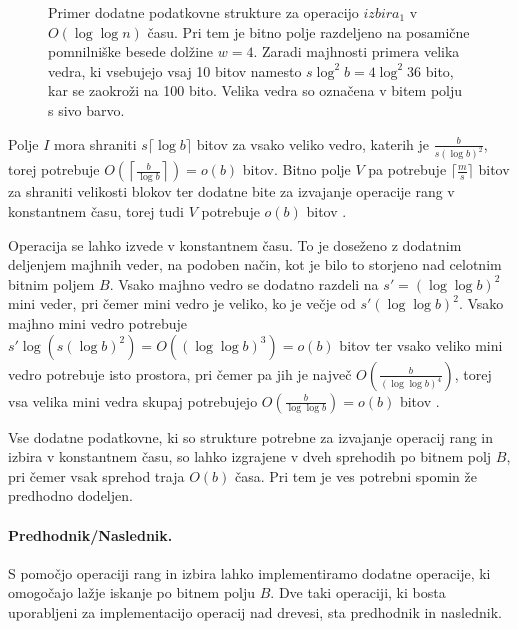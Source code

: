 \begin{figure}[htb]
    \begin{center}
        
        \caption{Primer dodatne podatkovne strukture za operacijo $izbira_1$ v $O(\log\log{n})$ času. Pri tem je bitno polje razdeljeno na posamične pomnilniške besede dolžine $w=4$. Zaradi majhnosti primera velika vedra, ki vsebujejo vsaj 10 bitov namesto $s\log^2b= 4\log^2{36}$ bito, kar se zaokroži na 100 bito. Velika vedra so označena v bitem polju s sivo barvo.} 
        \label{fig:select}
    \end{center}
\end{figure}

Polje $I$ mora shraniti $s\lceil\log b\rceil$ bitov za vsako veliko vedro, katerih je $\frac{b}{s(\log b)^2}$, torej potrebuje $O\left(\left\lceil\frac{b}{\log b}\right\rceil\right)=o(b)$ bitov. Bitno polje $V$ pa potrebuje $\lceil \frac{m}{s} \rceil$ bitov za shraniti velikosti blokov ter dodatne bite za izvajanje operacije rang v konstantnem času, torej tudi $V$ potrebuje $o(b)$ bitov \cite{Navarro2016}.

Operacija se lahko izvede v konstantnem času. To je doseženo z dodatnim deljenjem majhnih veder, na podoben način, kot je bilo to storjeno nad celotnim bitnim poljem $B$. Vsako majhno vedro se dodatno razdeli na $s'=(\log\log b)^2$ mini veder, pri čemer mini vedro je veliko, ko je večje od $s'(\log\log b)^2$. Vsako majhno mini vedro potrebuje $s'\log{(s(\log{b})^2)}=O((\log\log b)^3)=o(b)$ bitov ter vsako veliko mini vedro potrebuje isto prostora, pri čemer pa jih je največ $O\left(\frac{b}{(\log\log b)^4}\right)$, torej vsa velika mini vedra skupaj potrebujejo $O\left(\frac{b}{\log\log b}\right) =o(b)$ bitov \cite{Navarro2016}.


Vse dodatne podatkovne, ki so strukture potrebne za izvajanje operacij rang in izbira v konstantnem času, so lahko izgrajene v dveh sprehodih po bitnem polj $B$, pri čemer vsak sprehod traja $O(b)$ časa. Pri tem je ves potrebni spomin že predhodno dodeljen.

\paragraph{Predhodnik/Naslednik.}
S pomočjo operaciji rang in izbira lahko implementiramo dodatne operacije, ki omogočajo lažje iskanje po bitnem polju $B$. Dve taki operaciji, ki bosta uporabljeni za implementacijo operacij nad drevesi, sta predhodnik in naslednik.

